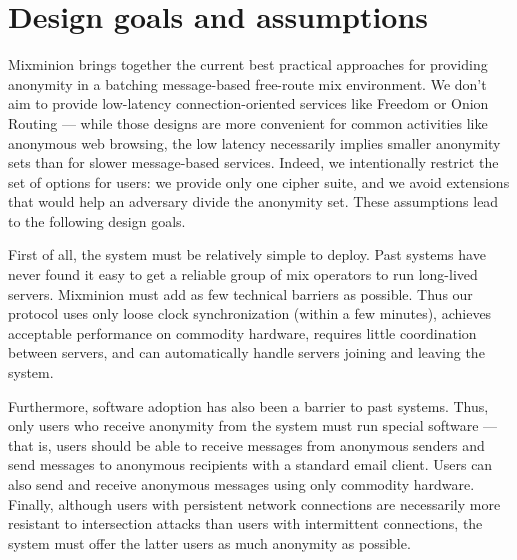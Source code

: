 \documentclass[11pt]{IEEEtran}
\begin{document}


\section{Design goals and assumptions}
\label{sec:assumptions}

Mixminion brings together the current best practical approaches
for providing anonymity in a batching message-based free-route mix
environment. We don't aim to provide low-latency connection-oriented
services like Freedom \cite{freedom} or Onion Routing \cite{goldschlag99}
--- while those designs are more convenient for common activities like
anonymous web browsing, the low latency necessarily implies smaller
anonymity sets than for slower message-based services. Indeed, we
intentionally restrict the set of options for users: we provide only one
cipher suite, and we avoid extensions that would help an adversary divide
the anonymity set. These assumptions lead to the following design goals.


First of all, the system must be relatively simple to deploy. Past systems
have never found it easy to get a reliable group of mix operators to
run long-lived servers. Mixminion must add as few technical barriers as
possible. Thus our protocol uses only loose clock synchronization (within
a few minutes), achieves acceptable performance on commodity hardware,
requires little coordination between servers, and can automatically
handle servers joining and leaving the system.

Furthermore, software adoption has also been a barrier to past
systems. Thus, only users who receive anonymity from the system must run
special software --- that is, users should be able to receive messages
from anonymous senders and send messages to anonymous recipients with a
standard email client. Users can also send and receive anonymous messages
using only commodity hardware. Finally, although users with persistent
network connections are necessarily more resistant to intersection
attacks than users with intermittent connections, the system must offer
the latter users as much anonymity as possible.
\end{document}
